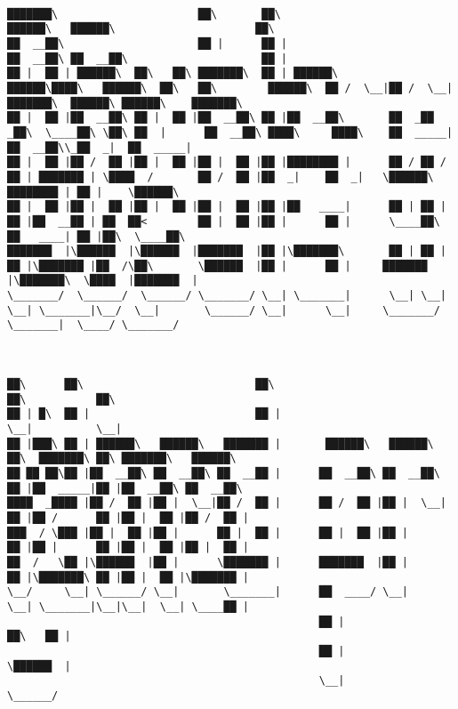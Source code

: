 \documentclass[varwidth=\maxdimen,margin=0.5cm,multi={verbatim}]{standalone}
\begin{document}
\begin{verbatim}

███████\                      ██\       ██\                                                                    ██████\   ██████\                      ██\
██  __██\                     ██ |      ██ |                                                                  ██  __██\ ██  __██\                     ██ |
██ |  ██ | ██████\  ██\   ██\ ███████\  ██ | ██████\        ██████\████\   ██████\  ██\   ██\        ██████\  ██ /  \__|██ /  \__|███████\  ██████\ ██████\    ███████\
██ |  ██ |██  __██\ ██ |  ██ |██  __██\ ██ |██  __██\       ██  _██  _██\  \____██\ \██\ ██  |      ██  __██\ ████\     ████\    ██  _____|██  __██\\_██  _|  ██  _____|
██ |  ██ |██ /  ██ |██ |  ██ |██ |  ██ |██ |████████ |      ██ / ██ / ██ | ███████ | \████  /       ██ /  ██ |██  _|    ██  _|   \██████\  ████████ | ██ |    \██████\
██ |  ██ |██ |  ██ |██ |  ██ |██ |  ██ |██ |██   ____|      ██ | ██ | ██ |██  __██ | ██  ██<        ██ |  ██ |██ |      ██ |      \____██\ ██   ____| ██ |██\  \____██\
███████  |\██████  |\██████  |███████  |██ |\███████\       ██ | ██ | ██ |\███████ |██  /\██\       \██████  |██ |      ██ |     ███████  |\███████\  \████  |███████  |
\_______/  \______/  \______/ \_______/ \__| \_______|      \__| \__| \__| \_______|\__/  \__|       \______/ \__|      \__|     \_______/  \_______|  \____/ \_______/



██\      ██\                           ██\                           ██\           ██\
██ | █\  ██ |                          ██ |                          \__|          \__|
██ |███\ ██ | ██████\   ██████\   ███████ |       ██████\   ██████\  ██\  ███████\ ██\ ███████\   ██████\
██ ██ ██\██ |██  __██\ ██  __██\ ██  __██ |      ██  __██\ ██  __██\ ██ |██  _____|██ |██  __██\ ██  __██\
████  _████ |██ /  ██ |██ |  \__|██ /  ██ |      ██ /  ██ |██ |  \__|██ |██ /      ██ |██ |  ██ |██ /  ██ |
███  / \███ |██ |  ██ |██ |      ██ |  ██ |      ██ |  ██ |██ |      ██ |██ |      ██ |██ |  ██ |██ |  ██ |
██  /   \██ |\██████  |██ |      \███████ |      ███████  |██ |      ██ |\███████\ ██ |██ |  ██ |\███████ |
\__/     \__| \______/ \__|       \_______|      ██  ____/ \__|      \__| \_______|\__|\__|  \__| \____██ |
                                                 ██ |                                            ██\   ██ |
                                                 ██ |                                            \██████  |
                                                 \__|                                             \______/



\end{verbatim}
\end{document}
